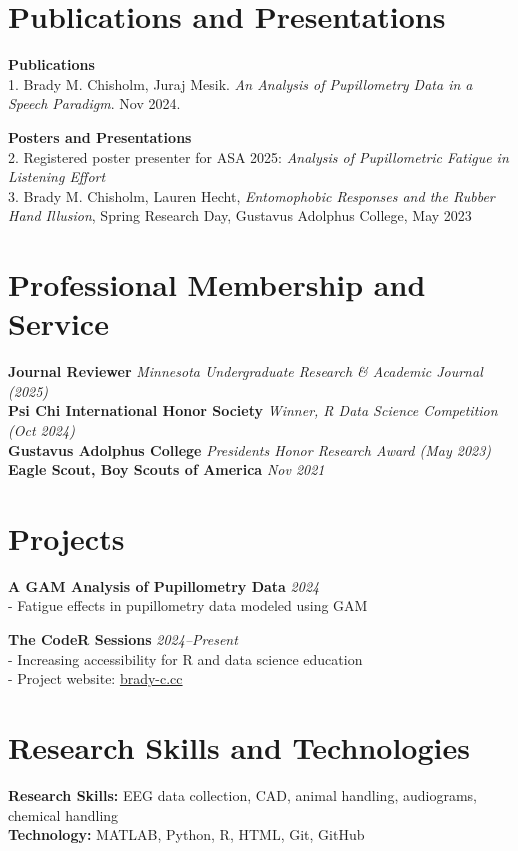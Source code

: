 \documentclass[12pt, a4paper]{article}
\begin{document}
\section*{Publications and Presentations}
\textbf{Publications} \\
1. Brady M. Chisholm, Juraj Mesik. \textit{An Analysis of Pupillometry Data in a Speech Paradigm}. Nov 2024.

\textbf{Posters and Presentations} \\
2. Registered poster presenter for ASA 2025: \textit{Analysis of Pupillometric Fatigue in Listening Effort} \\
3. Brady M. Chisholm, Lauren Hecht, \textit{Entomophobic Responses and the Rubber Hand Illusion}, Spring Research Day, Gustavus Adolphus College, May 2023

\section*{Professional Membership and Service}
\textbf{Journal Reviewer} \hfill \textit{Minnesota Undergraduate Research \& Academic Journal (2025)} \\
\textbf{Psi Chi International Honor Society} \hfill \textit{Winner, R Data Science Competition (Oct 2024)} \\
\textbf{Gustavus Adolphus College} \hfill \textit{Presidents Honor Research Award (May 2023)} \\
\textbf{Eagle Scout, Boy Scouts of America} \hfill \textit{Nov 2021}

\section*{Projects}
\textbf{A GAM Analysis of Pupillometry Data} \hfill \textit{2024} \\
- Fatigue effects in pupillometry data modeled using GAM

\textbf{The CodeR Sessions} \hfill \textit{2024--Present} \\
- Increasing accessibility for R and data science education \\
- Project website: \href{http://brady-c.cc}{brady-c.cc}

\section*{Research Skills and Technologies}
\textbf{Research Skills:} EEG data collection, CAD, animal handling, audiograms, chemical handling \\
\textbf{Technology:} MATLAB, Python, R, HTML, Git, GitHub
\end{document}

